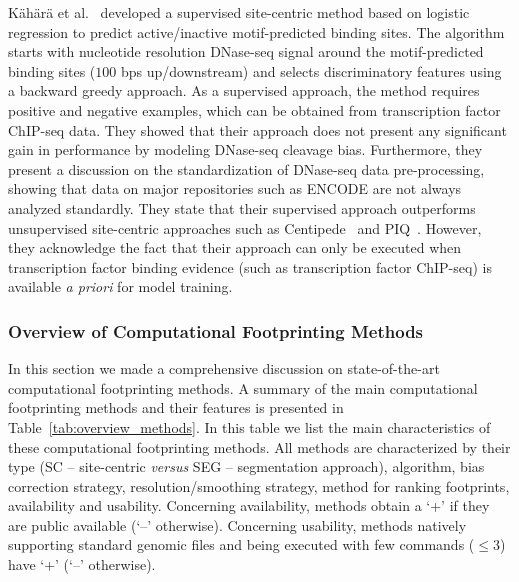 K\"{a}h\"{a}r\"{a} et al.~\cite{kahara2015} developed a supervised site-centric method based on logistic regression to predict active/inactive motif-predicted binding sites. The algorithm starts with nucleotide resolution DNase-seq signal around the motif-predicted binding sites ($100$ bps up/downstream) and selects discriminatory features using a backward greedy approach. As a supervised approach, the method requires positive and negative examples, which can be obtained from transcription factor ChIP-seq data. They showed that their approach does not present any significant gain in performance by modeling DNase-seq cleavage bias. Furthermore, they present a discussion on the standardization of DNase-seq data pre-processing, showing that data on major repositories such as ENCODE are not always analyzed standardly. They state that their supervised approach outperforms unsupervised site-centric approaches such as Centipede~\cite{pique2011} and PIQ~\cite{sherwood2014}. However, they acknowledge the fact that their approach can only be executed when transcription factor binding evidence (such as transcription factor ChIP-seq) is available \emph{a priori} for model training.

\subsubsection{Overview of Computational Footprinting Methods}
\label{sec:overview.comp.foot.met}

In this section we made a comprehensive discussion on state-of-the-art computational footprinting methods. A summary of the main computational footprinting methods and their features is presented in Table~\ref{tab:overview_methods}. In this table we list the main characteristics of these computational footprinting methods. All methods are characterized by their type (SC -- site-centric \emph{versus} SEG -- segmentation approach), algorithm, bias correction strategy, resolution/smoothing strategy, method for ranking footprints, availability and usability. Concerning availability, methods obtain a `+' if they are public available (`--' otherwise). Concerning usability, methods natively supporting standard genomic files and being executed with few commands ($\leq3$) have `+' (`--' otherwise).

